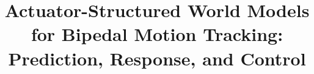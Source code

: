 \documentclass[letterpaper,10pt,conference]{ieeeconf}
\title{Actuator-Structured World Models for Bipedal Motion Tracking:\\Prediction, Response, and Control}
\author{\mbox{}}
\begin{document}
\maketitle

\clearpage
\balance


\end{document}
